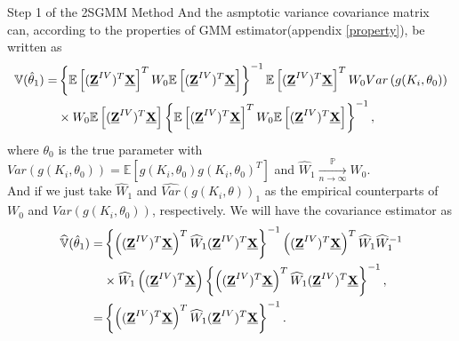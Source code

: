 \documentclass{article}
\theoremstyle{definition}
\newcommand{\limitP}{\mathop{\longrightarrow}\limits_{n \rightarrow \infty}^{\mathbb{P}}}
\begin{document}
\begin{itembox}[1]{{\color{blue} Step 1 of the 2SGMM Method}}
And the asmptotic variance covariance matrix can, according to the properties of GMM estimator(appendix \ref{property}), be written as\\
\begin{align*}
	\mathbb{V}(\hat{\theta}_1) = 
	& \left\{ \mathbb{E}\left[ (\textbf{\underline{Z}}^{IV})^T \textbf{\underline{X}} \right]^T W_0 \mathbb{E}\left[ (\textbf{\underline{Z}}^{IV})^T \textbf{\underline{X}}\right] \right\}^{-1} \mathbb{E}\left[ (\textbf{\underline{Z}}^{IV})^T \textbf{\underline{X}} \right]^T W_0 Var\left( g(K_i, \theta_0)\right)\\
	& \times W_0 \mathbb{E}\left[ (\textbf{\underline{Z}}^{IV})^T \textbf{\underline{X}} \right] \left\{ \mathbb{E}\left[ (\textbf{\underline{Z}}^{IV})^T \textbf{\underline{X}} \right]^T W_0 \mathbb{E}\left[ (\textbf{\underline{Z}}^{IV})^T \textbf{\underline{X}} \right] \right\}^{-1},
\end{align*}
where $\theta_0$ is the true parameter with $Var\left( g(K_i, \theta_0)\right) = \mathbb{E}\left[g(K_i, \theta_0)g(K_i, \theta_0)^T \right]$ and $\widehat{W}_1 \limitP W_0$.\\
And if we just take $\widehat{W}_1$ and $\widehat{Var}(g(K_i, \theta))_1$ as the empirical counterparts of $W_0$ and $Var\left( g(K_i, \theta_0)\right)$, respectively. We will have the covariance estimator as\\
\begin{align*}
	\widehat{\mathbb{V}}(\hat{\theta}_1) = 
	& \left\{\left((\textbf{\underline{Z}}^{IV})^T \textbf{\underline{X}} \right)^T \widehat{W}_1 (\textbf{\underline{Z}}^{IV})^T \textbf{\underline{X}} \right\}^{-1} \left((\textbf{\underline{Z}}^{IV})^T \textbf{\underline{X}} \right)^T \widehat{W}_1 \widehat{W}_1^{-1}\\
	& \times \widehat{W}_1 \left((\textbf{\underline{Z}}^{IV})^T \textbf{\underline{X}} \right) \left\{\left((\textbf{\underline{Z}}^{IV})^T \textbf{\underline{X}} \right)^T \widehat{W}_1 (\textbf{\underline{Z}}^{IV})^T \textbf{\underline{X}} \right\}^{-1},\\
	= & \left\{\left((\textbf{\underline{Z}}^{IV})^T \textbf{\underline{X}} \right)^T \widehat{W}_1 (\textbf{\underline{Z}}^{IV})^T \textbf{\underline{X}} \right\}^{-1}.
\end{align*}

\end{itembox}
\end{document}
